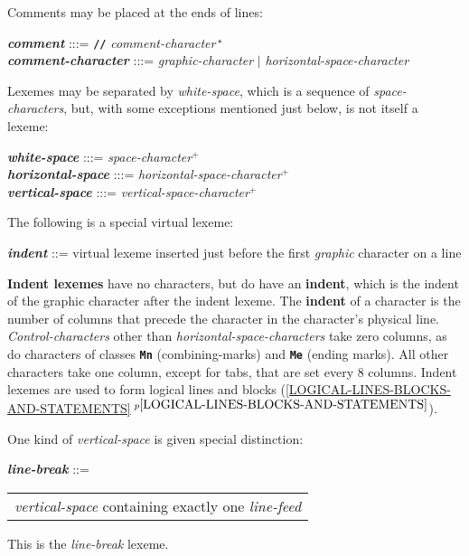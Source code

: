 \documentclass[12pt]{article}
\newcommand{\TT}[1]{{\tt \bfseries #1}}
\newcommand{\PLUS}[1][]{{$^{+#1}$}}
\newcommand{\key}[1]{{\rm \bfseries #1}}
\newcommand{\emkey}[1]{{\em \bfseries #1}}
\newcommand{\itemref}[1]{\ref{#1}$\,^{p\pageref{#1}}$}
\newenvironment{indpar}[1][0.3in]%
	{\begin{list}{}%
		     {\setlength{\itemsep}{0in}%
		      \setlength{\topsep}{0in}%
		      \setlength{\parsep}{1ex}%
		      \setlength{\labelwidth}{#1}%
		      \setlength{\leftmargin}{#1}%
		      \addtolength{\leftmargin}{\labelsep}}%
	 \item}%
	{\end{list}}
\begin{document}
Comments may be placed at the ends of lines:
\begin{indpar}
\emkey{comment}\label{COMMENT} :::=
    \TT{//} {\em comment-character}\,$^\star$
\\[1ex]
\emkey{comment-character} :::= {\em graphic-character}
                          $|$ {\em horizontal-space-character}
\end{indpar}

Lexemes may be separated by {\em white-space}, which
is a sequence of {\em space-characters},
but, with some exceptions mentioned just below, is not itself a lexeme:
\begin{indpar}
\emkey{white-space} :::= {\em space-character}\PLUS{}
\\[0.3ex]
\emkey{horizontal-space} :::= {\em horizontal-space-character}\PLUS{}
\\[0.3ex]
\emkey{vertical-space} :::= {\em vertical-space-character}\PLUS{}
\end{indpar}

The following is a special virtual lexeme:
\begin{indpar}
\emkey{indent}\label{INDENT} ::=
        virtual lexeme inserted just before the first
	{\em graphic} character on a line
\end{indpar}

\key{Indent lexemes} have no characters, but
do have an \key{indent}, which is the indent of
the graphic character after the indent lexeme.
The \key{indent} of a character is the number
of columns that precede the character in the character's physical line.
{\em Control-characters} other than {\em horizontal-space-characters}
take zero columns, as do characters of classes \TT{Mn} (combining-marks)
and \TT{Me} (ending marks).  All other characters take one column,
except for tabs, that are set every 8 columns.
Indent lexemes are used to form logical lines and blocks
(\itemref{LOGICAL-LINES-BLOCKS-AND-STATEMENTS}).

One kind of {\em vertical-space} is given special distinction:
\begin{indpar}
\emkey{line-break}\label{LINE-BREAK} ::=
	\begin{tabular}[t]{l}
        {\em vertical-space} containing exactly one {\em line-feed}
	\end{tabular}
\end{indpar}

This is the {\em line-break} lexeme.
\end{document}
